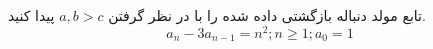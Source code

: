 \p
    تابع مولد دنباله بازگشتی داده شده را با در نظر گرفتن
    $a, b > c$
    پیدا کنید.
        $$a_n - 3 a_{n-1} = n^2 ; n \geq 1 ; a_0 = 1$$
